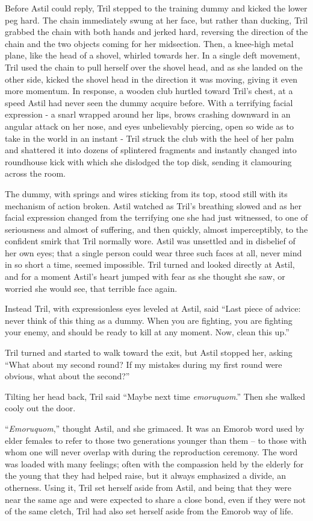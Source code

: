 \documentclass[12pt]{book}
\begin{document}
Before Astil could reply, Tril stepped to the training dummy and kicked the lower peg hard.  The chain immediately swung at her face, but rather than ducking, Tril grabbed the chain with both hands and jerked hard, reversing the direction of the chain and the two objects coming for her midsection.  Then, a knee-high metal plane, like the head of a shovel, whirled towards her.  In a single deft movement, Tril used the chain to pull herself over the shovel head, and as she landed on the other side, kicked the shovel head in the direction it was moving, giving it even more momentum.  In response, a wooden club hurtled toward Tril's chest, at a speed Astil had never seen the dummy acquire before.  With a terrifying facial expression - a snarl wrapped around her lips, brows crashing downward in an angular attack on her nose, and eyes unbelievably piercing, open so wide as to take in the world in an instant - Tril struck the club with the heel of her palm and shattered it into dozens of splintered fragments and instantly changed into roundhouse kick with which she dislodged the top disk, sending it clamouring across the room.  

 The dummy, with springs and wires sticking from its top, stood still with its mechanism of action broken.  Astil watched as Tril's breathing slowed and as her facial expression changed from the terrifying one she had just witnessed, to one of seriousness and almost of suffering, and then quickly, almost imperceptibly, to the confident smirk that Tril normally wore.  Astil was unsettled and in disbelief of her own eyes; that a single person could wear three such faces at all, never mind in so short a time, seemed impossible.  Tril turned and looked directly at Astil, and for a moment Astil's heart jumped with fear as she thought she saw, or worried she would see, that terrible face again.  
 
 Instead Tril, with expressionless eyes leveled at Astil, said ``Last piece of advice: never think of this thing as a dummy.  When you are fighting, you are fighting your enemy, and should be ready to kill at any moment.  Now, clean this up.''

Tril turned and started to walk toward the exit, but Astil stopped her, asking ``What about my second round? If my mistakes during my first round were obvious, what about the second?''
 
Tilting her head back, Tril said ``Maybe next time \emph{emoruquom}.''  Then she walked cooly out the door.

``\emph{Emoruquom},'' thought Astil, and she grimaced.  It was an Emorob word used by elder females to refer to those two generations younger than them -- to those with whom one will never overlap with during the reproduction ceremony.  The word was loaded with many feelings; often with the compassion held by the elderly for the young that they had helped raise, but it always emphasized a divide, an otherness.  Using it, Tril set herself aside from Astil, and being that they were near the same age and were expected to share a close bond, even if they were not of the same cletch, Tril had also set herself aside from the Emorob way of life.
\end{document}
